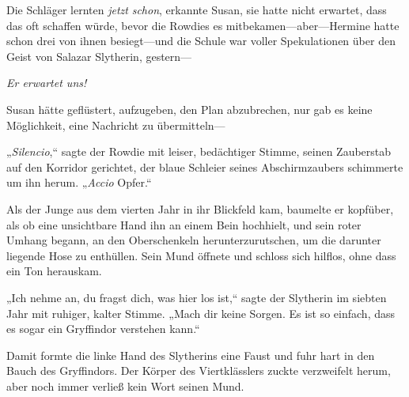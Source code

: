 Die Schläger lernten \emph{jetzt} \emph{schon}, erkannte Susan, sie hatte nicht erwartet, dass \SPHEW das oft schaffen würde, bevor die Rowdies es mitbekamen—aber—Hermine hatte schon drei von ihnen besiegt—und die Schule war voller Spekulationen über den Geist von Salazar Slytherin, gestern—

\emph{Er erwartet uns!}

Susan hätte geflüstert, aufzugeben, den Plan abzubrechen, nur gab es keine Möglichkeit, eine Nachricht zu übermitteln—

„\emph{Silencio},“ sagte der Rowdie mit leiser, bedächtiger Stimme, seinen Zauberstab auf den Korridor gerichtet, der blaue Schleier seines Abschirmzaubers schimmerte um ihn herum. „\emph{Accio} Opfer.“

Als der Junge aus dem vierten Jahr in ihr Blickfeld kam, baumelte er kopfüber, als ob eine unsichtbare Hand ihn an einem Bein hochhielt, und sein roter Umhang begann, an den Oberschenkeln herunterzurutschen, um die darunter liegende Hose zu enthüllen. Sein Mund öffnete und schloss sich hilflos, ohne dass ein Ton herauskam.

„Ich nehme an, du fragst dich, was hier los ist,“ sagte der Slytherin im siebten Jahr mit ruhiger, kalter Stimme. „Mach dir keine Sorgen. Es ist so einfach, dass es sogar ein Gryffindor verstehen kann.“

Damit formte die linke Hand des Slytherins eine Faust und fuhr hart in den Bauch des Gryffindors. Der Körper des Viertklässlers zuckte verzweifelt herum, aber noch immer verließ kein Wort seinen Mund.

